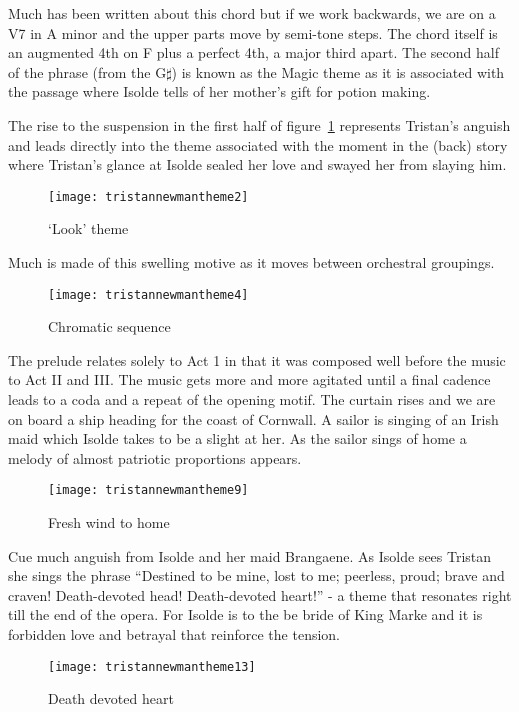 Much has been written about this chord but if we work backwards, we are on a V7 in A minor and the upper parts move by semi-tone steps. The chord itself is an augmented 4th on F plus a perfect 4th, a major third apart. The second half of the phrase (from the G$\sharp$) is known as the Magic theme as it is associated with the passage where Isolde tells of her mother's gift for potion making. 


The rise to the suspension in the first half of figure~\ref{fig:tristannewman2} represents Tristan's anguish and leads directly into the theme associated with the moment in the (back) story where Tristan's glance at Isolde sealed her love and swayed her from slaying him.  

\begin{figure}[h]
\centering
\texttt{[image: tristannewmantheme2]}\caption{`Look' theme}
\label{fig:tristannewman2}
\end{figure}

Much is made of this swelling motive as it moves between orchestral groupings. 

\begin{figure}[H]
\centering
\texttt{[image: tristannewmantheme4]}\caption{Chromatic sequence}
\label{fig:tristanchromaticsequence}
\end{figure}

The prelude relates solely to Act 1 in that it was composed well before the music to Act II and III. The music gets more and more agitated until a final cadence leads to a coda and a repeat of the opening motif. The curtain rises and we are on board a ship heading for the coast of Cornwall. A sailor is singing of an Irish maid which Isolde takes to be a slight at her. As the sailor sings of home a melody of almost patriotic proportions appears. 

\begin{figure}[H]
\centering
\texttt{[image: tristannewmantheme9]}\caption{Fresh wind to home}
\label{fig:tristanfreshwind}
\end{figure}

Cue much anguish from Isolde and her maid Brangaene. As Isolde sees Tristan she sings the phrase ``Destined to be mine, lost to me; peerless, proud; brave and craven! Death-devoted head! Death-devoted heart!'' - a theme that resonates right till the end of the opera. For Isolde is to the be bride of King Marke and it is forbidden love and betrayal that reinforce the tension. 

\begin{figure}[H]
\centering
\texttt{[image: tristannewmantheme13]}\caption{Death devoted heart}
\label{fig:tristandeathdevotedheart}
\end{figure}
 
